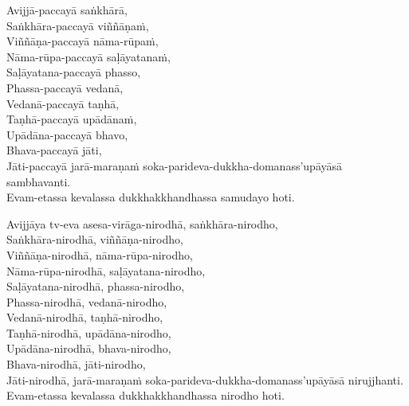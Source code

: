\suttaRef{[SN 56.24]}

Avijjā-paccayā saṅkhārā,\\
Saṅkhāra-paccayā viññāṇaṁ,\\
Viññāṇa-paccayā nāma-rūpaṁ,\\
Nāma-rūpa-paccayā saḷāyatanaṁ,\\
Saḷāyatana-paccayā phasso,\\
Phassa-paccayā vedanā,\\
Vedanā-paccayā taṇhā,\\
Taṇhā-paccayā upādānaṁ,\\
Upādāna-paccayā bhavo,\\
Bhava-paccayā jāti,\\
Jāti-paccayā jarā-maraṇaṁ soka-parideva-dukkha-domanass'upāyāsā sambhavanti.\\
Evam-etassa kevalassa dukkhakkhandhassa samudayo hoti.

Avijjāya tv-eva asesa-virāga-nirodhā, saṅkhāra-nirodho,\\
Saṅkhāra-nirodhā, viññāṇa-nirodho,\\
Viññāṇa-nirodhā, nāma-rūpa-nirodho,\\
Nāma-rūpa-nirodhā, saḷāyatana-nirodho,\\
Saḷāyatana-nirodhā, phassa-nirodho,\\
Phassa-nirodhā, vedanā-nirodho,\\
Vedanā-nirodhā, taṇhā-nirodho,\\
Taṇhā-nirodhā, upādāna-nirodho,\\
Upādāna-nirodhā, bhava-nirodho,\\
Bhava-nirodhā, jāti-nirodho,\\
Jāti-nirodhā, jarā-maraṇaṁ soka-parideva-dukkha-domanass'upāyāsā nirujjhanti.\\
Evam-etassa kevalassa dukkhakkhandhassa nirodho hoti.


